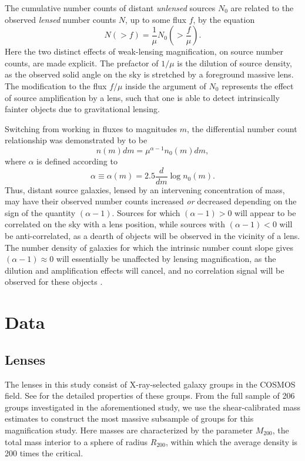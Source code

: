 \documentclass[iop]{emulateapj}
\begin{document}
The cumulative number counts of distant {\it unlensed} sources $N_0$ are related to the observed {\it lensed} number counts $N$, up to some flux $f$, by the equation
\begin{equation}
N (>f) = \frac{1}{\mu} N_0 \left( > \frac{f}{\mu} \right).
\end{equation}
Here the two distinct effects of weak-lensing magnification, on source number counts, are made explicit. The prefactor of $1 / \mu$ is the dilution of source density, as the observed solid angle on the sky is stretched by a foreground massive lens. The modification to the flux $f / \mu$ inside the argument of $N_0$ represents the effect of source amplification by a lens, such that one is able to detect intrinsically fainter objects due to gravitational lensing.

Switching from working in fluxes to magnitudes $m$, the differential number count relationship was demonstrated by \citet{Narayan89} to be
\begin{equation}
n(m)dm = \mu ^{\alpha -1} n_0 (m)dm,
\end{equation}
where $\alpha$ is defined according to
\begin{equation}
\alpha \equiv \alpha(m) = 2.5 \frac{d}{dm} \log n_0(m).
\end{equation}
Thus, distant source galaxies, lensed by an intervening concentration of mass, may have their observed number counts increased {\it or} decreased depending on the sign of the quantity $(\alpha -1)$. Sources for which $(\alpha -1) > 0$ will appear to be correlated on the sky with a lens position, while sources with $(\alpha -1) < 0$ will be anti-correlated, as a dearth of objects will be observed in the vicinity of a lens. The number density of galaxies for which the intrinsic number count slope gives $(\alpha -1) \approx 0$ will essentially be unaffected by lensing magnification, as the dilution and amplification effects will cancel, and no correlation signal will be observed for these objects \citep{Scranton05}.

\section{Data}
\label{data}
\subsection{Lenses}
The lenses in this study consist of X-ray-selected galaxy groups in the COSMOS field. See \citet{Leauthaud10} for the detailed properties of these groups. From the full sample of 206 groups investigated in the aforementioned study, we use the shear-calibrated mass estimates to construct the most massive subsample of groups for this magnification study. Here masses are characterized by the parameter $M_{200}$, the total mass interior to a sphere of radius $R_{200}$, within which the average density is 200 times the critical. 
\end{document}
